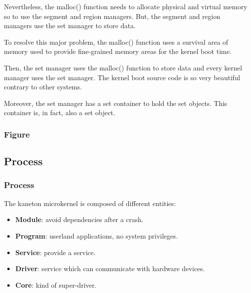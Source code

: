 {\begin{frame}
  Nevertheless, the malloc() function needs to allocate physical and
  virtual memory so to use the segment and region managers. But, the
  segment and region managers use the set manager to store data.

  \nl

  To resolve this major problem, the malloc() function uses a survival area
  of memory used to provide fine-grained memory areas for the kernel
  boot time.

  \nl

  Then, the set manager uses the malloc() function to store data and
  every kernel manager uses the set manager. The kernel boot source code
  is so very beautiful contrary to other systems.

  \nl

  Moreover, the set manager has a set container to hold the set objects. This
  container is, in fact, also a set object.
\end{frame}


\begin{frame}
  \frametitle{Figure}

  \begin{center}
  \end{center}
\end{frame}

%
%

\subsection{Process}


\begin{frame}
  \frametitle{Process}

  The kaneton microkernel is composed of different entities:

  \begin{itemize}
    \item
      \textbf{Module}: avoid dependencies after a crash.
    \item
      \textbf{Program}: userland applications, no system privileges.
    \item
      \textbf{Service}: provide a service.
    \item
      \textbf{Driver}: service which can communicate with hardware devices.
    \item
      \textbf{Core}: kind of super-driver.
  \end{itemize}


\end{frame}}
